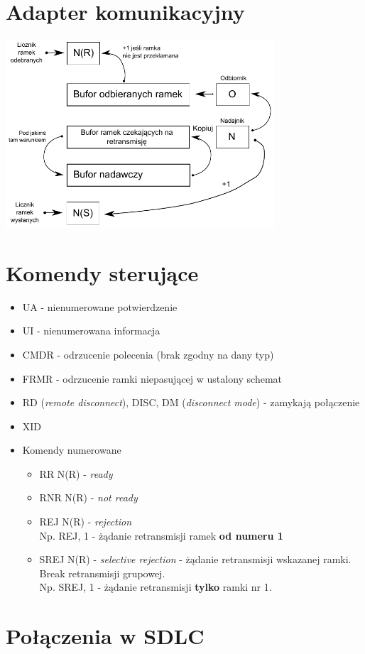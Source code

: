 \documentclass[a4paper,twoside]{article}
\begin{document}
\section{Adapter komunikacyjny}
\includegraphics[width=10cm]{./images/image12.pdf}

\section{Komendy sterujące}
\begin{itemize}
	\item UA - nienumerowane potwierdzenie
	\item UI - nienumerowana informacja
	\item CMDR - odrzucenie polecenia (brak zgodny na dany typ)
	\item FRMR - odrzucenie ramki niepasującej w ustalony schemat
	\item RD (\emph{remote disconnect}), DISC, DM (\emph{disconnect mode}) - zamykają połączenie
	\item XID
	\item Komendy numerowane
	\begin{itemize}
		\item RR N(R) - \emph{ready}
		\item RNR N(R) - \emph{not ready}
		\item REJ N(R) - \emph{rejection}\\
		Np. REJ, 1 - żądanie retransmisji ramek \textbf{od numeru 1}
		\item SREJ N(R) - \emph{selective rejection} - żądanie retransmisji wskazanej ramki. Break retransmisji grupowej.\\
		Np. SREJ, 1 - żądanie retransmisji \textbf{tylko} ramki nr 1.
	\end{itemize}
\end{itemize}
\section{Połączenia w SDLC}
\end{document}
